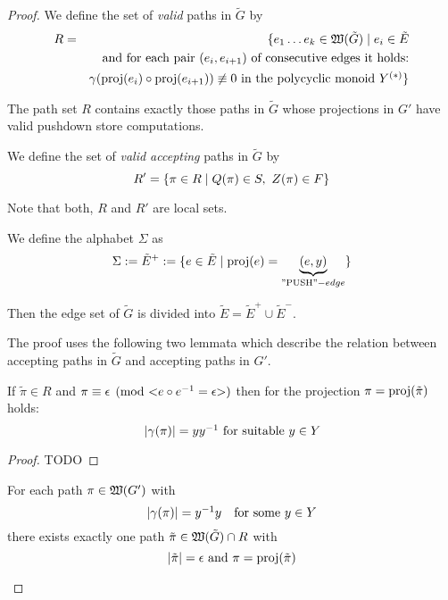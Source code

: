 \begin{proof}
We define the set of {\em valid} paths in $\tilde{G}$ by
\begin{eqnarray*}
R &=& \{ e_1 \ldots e_k \in \mbox{$\mathfrak{W}({\tilde{G}})$} \mid e_i \in \tilde{E} \\
& & \text{and for each pair }(e_i, e_{i+1})\text{ of consecutive edges it
holds:}\\
& & \gamma(\mathrm{proj}({e_i}) \circ \mathrm{proj}({e_{i+1}})) \not\equiv 0\text{ in the
polycyclic monoid }\mbox{${Y}^{(*)}$} \}
\end{eqnarray*} 

The path set $R$ contains exactly those paths in $\tilde{G}$ whose projections
in $G'$ have valid pushdown store computations.

We define the set of {\em valid accepting} paths in $\tilde{G}$ by
\begin{equation*}
R' = \mbox{$\{\pi \in R \mid Q(\pi) \in S,\ Z(\pi) \in F\}$}
\end{equation*}

Note that both, $R$ and $R'$ are local sets.

We define the alphabet $\Sigma$ as 
\begin{equation*}
\Sigma := \tilde{E}^+ := \mbox{$\{e \in \tilde{E} \mid \mathrm{proj}({e}) =
\underbrace{(e,y)}_{\text{''PUSH''}-edge}\}$}
\end{equation*}

Then the edge set of $\tilde{G}$ is divided into $\tilde{E} = \tilde{E}^+ \cup
\tilde{E}^-$.

The proof uses the following two lemmata which describe the relation between
accepting paths in $\tilde{G}$ and accepting paths in $G'$.

\begin{lemma}
If $\tilde{\pi} \in R$ and $\pi \equiv \epsilon \pmod{{<}e\circ \mbox{${e}^{-1}$} =
\epsilon{>}}$ then for the projection $\pi = \mathrm{proj}({\tilde{\pi}})$ holds:
\[ |\gamma(\pi)| = y \mbox{${y}^{-1}$}\text{ for suitable }y \in Y \]
\end{lemma}

\begin{proof}
TODO
\end{proof}

\begin{lemma}
For each path $\pi \in \mbox{$\mathfrak{W}({G'})$}$ with
\[ |\gamma(\pi)| = \mbox{${y}^{-1}$} y \quad\text{for some }y \in Y \]
there exists exactly one path $\tilde{\pi} \in \mbox{$\mathfrak{W}({\tilde{G}})$} \cap R$ with
\[ |\tilde{\pi}| = \epsilon\text{ and }\pi = \mathrm{proj}({\tilde{\pi}}) \] 
\end{lemma}


\end{proof}
